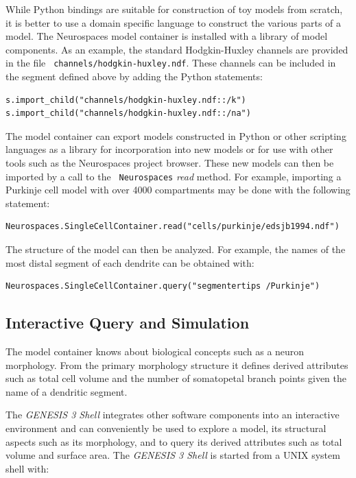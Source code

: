 \documentclass[12pt]{article}
\begin{document}
While Python bindings are suitable for construction of toy models from
scratch, it is better to use a domain specific language to construct
the various parts of a model. The Neurospaces model container is
installed with a library of model components.  As an example, the
standard Hodgkin-Huxley channels are provided in the file {\tt
  channels/hodgkin-huxley.ndf}.  These channels can be included in the
segment defined above by adding the Python statements:

{\footnotesize
  \resetlinenumber[23]
  \linenumbers
\begin{verbatim}
s.import_child("channels/hodgkin-huxley.ndf::/k")
s.import_child("channels/hodgkin-huxley.ndf::/na")
\end{verbatim}
}

The model container can export models constructed in Python or other
scripting languages as a library for incorporation into new models or
for use with other tools such as the Neurospaces project browser.
These new models can then be imported by a call to the {\tt
  Neurospaces} {\it read} method. For example, importing a Purkinje
cell model with over 4000 compartments may be done with the following
statement:

{\footnotesize
\begin{verbatim}
Neurospaces.SingleCellContainer.read("cells/purkinje/edsjb1994.ndf")
\end{verbatim}
}

The structure of the model can then be analyzed.  For example, the
names of the most distal segment of each dendrite can be obtained
with:

{\footnotesize
\begin{verbatim}
Neurospaces.SingleCellContainer.query("segmentertips /Purkinje")
\end{verbatim}
}


\subsection{Interactive Query and Simulation}

The model container knows about biological concepts such as a neuron
morphology.  From the primary morphology structure it defines derived
attributes such as total cell volume and the number of somatopetal
branch points given the name of a dendritic segment.

The {\it GENESIS 3 Shell} integrates other software components into an
interactive environment and can conveniently be used to explore a
model, its structural aspects such as its morphology, and to query its
derived attributes such as total volume and surface area.  The {\it
  GENESIS 3 Shell} is started from a UNIX system shell with:
\end{document}
